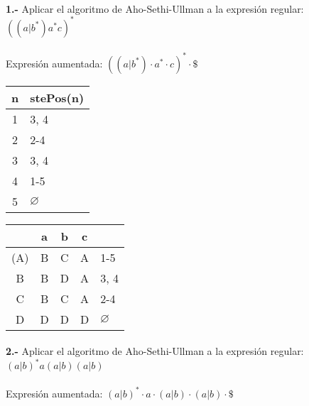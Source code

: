 \documentclass[11pt,a4paper]{report}
\begin{document}
\paragraph{}

\paragraph{}
\textbf{1.-} Aplicar el algoritmo de Aho-Sethi-Ullman a la expresión regular: \textbf{$ ((a|b^*)a^*c)^* $} \\
\\
Expresión aumentada: $ ((a|b^*)\cdot a^*\cdot c)^*\cdot \$  $ \\

\begin{tabular} {| c | l |}
\hline
n & stePos(n) \\ \hline
1 & 3, 4 \\ \hline
2 & 2-4 \\ \hline
3 & 3, 4 \\ \hline
4 & 1-5 \\ \hline
5 & $\varnothing$ \\ \hline
\end{tabular}
\quad
\begin{tabular} {| c | c |c |c | l |}
\hline 
& a & b & c & \\ \hline
(A) & B & C & A & 1-5\\ \hline
B & B & D & A & 3, 4\\ \hline
C & B & C & A & 2-4\\ \hline
D & D & D & D & $\varnothing$\\ \hline
\end{tabular}\paragraph{}
\textbf{2.-} Aplicar el algoritmo de Aho-Sethi-Ullman a la expresión regular: \textbf{$ (a|b)^*a(a|b)(a|b) $} \\
\\
Expresión aumentada: $ (a|b)^*\cdot a\cdot (a|b)\cdot (a|b)\cdot \$  $ \\
\end{document}
